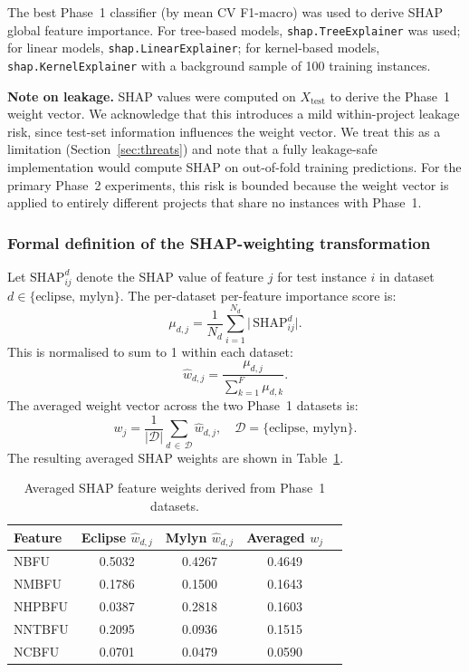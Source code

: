 \documentclass[12pt, a4paper]{article}
\begin{document}
The best Phase~1 classifier (by mean CV F1-macro) was used to derive SHAP
global feature importance. For tree-based models,
\texttt{shap.TreeExplainer} was used; for linear models,
\texttt{shap.LinearExplainer}; for kernel-based models,
\texttt{shap.KernelExplainer} with a background sample of 100 training
instances.

\textbf{Note on leakage.} SHAP values were computed on $X_\text{test}$ to
derive the Phase~1 weight vector. We acknowledge that this introduces a mild
within-project leakage risk, since test-set information influences the weight
vector. We treat this as a limitation (Section~\ref{sec:threats}) and note
that a fully leakage-safe implementation would compute SHAP on out-of-fold
training predictions. For the primary Phase~2 experiments, this risk is
bounded because the weight vector is applied to entirely different projects
that share no instances with Phase~1.

\subsubsection*{Formal definition of the SHAP-weighting transformation}

Let $\text{SHAP}^d_{ij}$ denote the SHAP value of feature $j$ for test
instance $i$ in dataset $d \in \{\text{eclipse},\,\text{mylyn}\}$.
The per-dataset per-feature importance score is:
\begin{equation}
  \mu_{d,j} = \frac{1}{N_d}\sum_{i=1}^{N_d}
              \bigl|\,\text{SHAP}^d_{ij}\bigr|.
  \label{eq:mu}
\end{equation}
This is normalised to sum to 1 within each dataset:
\begin{equation}
  \hat{w}_{d,j} = \frac{\mu_{d,j}}{\displaystyle\sum_{k=1}^{F}\mu_{d,k}}.
  \label{eq:what}
\end{equation}
The averaged weight vector across the two Phase~1 datasets is:
\begin{equation}
  w_j = \frac{1}{|\mathcal{D}|}
        \sum_{d\,\in\,\mathcal{D}} \hat{w}_{d,j},
  \quad \mathcal{D} = \{\text{eclipse},\,\text{mylyn}\}.
  \label{eq:wavg}
\end{equation}
The resulting averaged SHAP weights are shown in Table~\ref{tab:shap_weights}.

\begin{table}[H]
\caption{Averaged SHAP feature weights derived from Phase~1 datasets.}
\label{tab:shap_weights}
\centering
\small
\renewcommand{\arraystretch}{1.2}
\begin{tabular}{@{}lcccc@{}}
\toprule
\textbf{Feature} & \textbf{Eclipse $\hat{w}_{d,j}$}
  & \textbf{Mylyn $\hat{w}_{d,j}$} & \textbf{Averaged $w_j$} \\
\midrule
NBFU   & 0.5032 & 0.4267 & 0.4649 \\
NMBFU  & 0.1786 & 0.1500 & 0.1643 \\
NHPBFU & 0.0387 & 0.2818 & 0.1603 \\
NNTBFU & 0.2095 & 0.0936 & 0.1515 \\
NCBFU  & 0.0701 & 0.0479 & 0.0590 \\
\bottomrule
\end{tabular}
\end{table}
\end{document}
